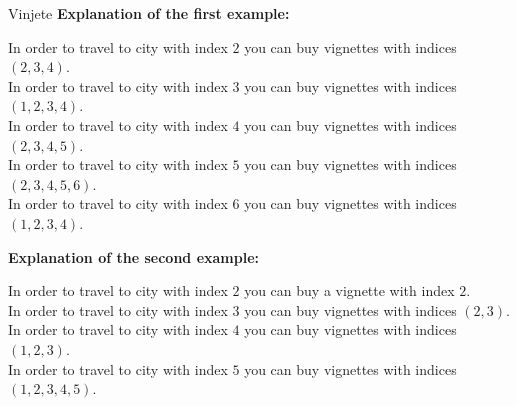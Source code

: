 \begin{statement}[
  problempoints=100,
  timelimit=3 seconds,
  memorylimit=512 MiB,
]{Vinjete}
\textbf{Explanation of the first example:}

In order to travel to city with index $2$ you can buy vignettes with indices $(2, 3, 4)$.\\
In order to travel to city with index $3$ you can buy vignettes with indices $(1, 2, 3, 4)$.\\
In order to travel to city with index $4$ you can buy vignettes with indices $(2, 3, 4, 5)$.\\
In order to travel to city with index $5$ you can buy vignettes with indices $(2, 3, 4, 5, 6)$.\\
In order to travel to city with index $6$ you can buy vignettes with indices $(1, 2, 3, 4)$.

\textbf{Explanation of the second example:}

In order to travel to city with index $2$ you can buy a vignette with index $2$.\\
In order to travel to city with index $3$ you can buy vignettes with indices $(2, 3)$.\\
In order to travel to city with index $4$ you can buy vignettes with indices $(1, 2, 3)$.\\
In order to travel to city with index $5$ you can buy vignettes with indices $(1, 2, 3, 4, 5)$.
\end{statement}

